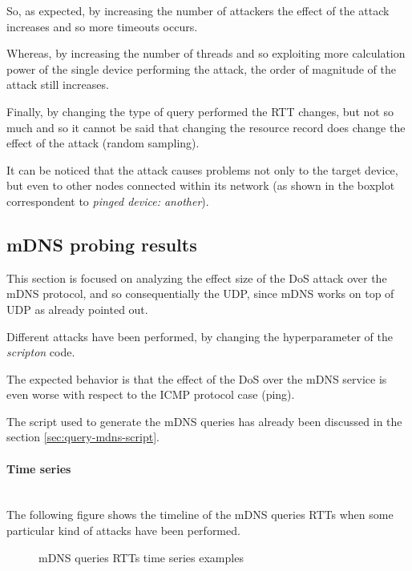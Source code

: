 \documentclass[fleqn, 11pt]{SelfArx} %
\begin{document}
So, as expected, by increasing the number of attackers the effect of the attack increases and so more timeouts occurs.

Whereas, by increasing the number of threads and so exploiting more calculation power of the single device performing the attack, the order of magnitude of the attack still increases.

Finally, by changing the type of query performed the RTT changes, but not so much and so it cannot be said that changing the resource record does change the effect of the attack (random sampling).

It can be noticed that the attack causes problems not only to the target device, but even to other nodes connected within its network  (as shown in the boxplot correspondent to {\it{pinged device: another}}).
\subsection{mDNS probing results}
This section is focused on analyzing the effect size of the DoS attack over the mDNS protocol, and so consequentially the UDP, since mDNS works on top of UDP as already pointed out.

Different attacks have been performed, by changing the hyperparameter of the {\it{scripton}} code.

The expected behavior is that the effect of the DoS over the mDNS service is even worse with respect to the ICMP protocol case (ping).

The script used to generate the mDNS queries has already been discussed in the section \ref{sec:query-mdns-script}.
\paragraph{Time series}\mbox{}\\
The following figure shows the timeline of the mDNS queries RTTs when some particular kind of attacks have been performed.

\begin{figure}[H]
    \centering
    \qquad
    \caption{mDNS queries RTTs time series examples}%
    \label{fig:mdns-rtts-time-series}%
\end{figure}
\end{document}
